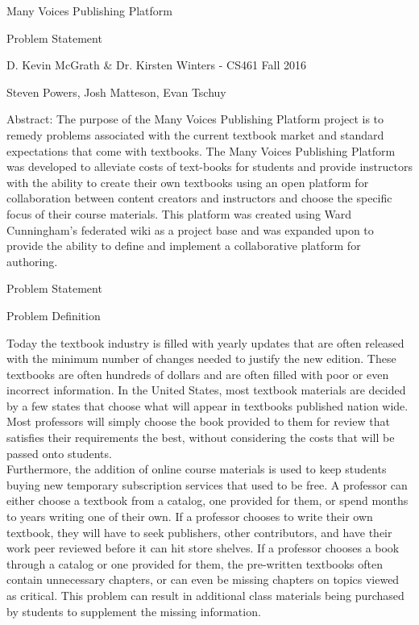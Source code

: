 \documentclass[letterpaper, 10pt, draftclsnofoot, onecolumn]{IEEEtran}
\begin{document}
\begin{titlepage}
\centering
{\huge Many Voices Publishing Platform\par}
{\LARGE Problem Statement\par}
{\vspace{2mm}}
{\large D. Kevin McGrath \& Dr. Kirsten Winters -  CS461 Fall 2016\par}
{\large Steven Powers, Josh Matteson, Evan Tschuy\par}
{\vspace{10mm}}
{\large Abstract:  The purpose of the Many Voices Publishing Platform project is to remedy problems 
associated with the current textbook market and standard expectations that come 
with textbooks. The Many Voices Publishing Platform was developed to alleviate 
costs of text-books for students and provide instructors with the ability 
to create their own textbooks using an open platform for collaboration between 
content creators and instructors and choose the specific focus of their course materials. 
This platform was created using Ward Cunningham’s federated wiki as a project 
base and was expanded upon to provide the ability to define and implement a 
collaborative platform for authoring.\par}
\end{titlepage}

\vspace{1pc}
\centerline{\sc \large Problem Statement}
\vspace{2pc}

\vspace{1pc}
\normalsize Problem Definition
\vspace{1pc}

 Today the textbook industry is filled with yearly updates that are often released with the
minimum number of changes needed to justify the new edition. These textbooks are often hundreds of dollars 
and are often filled with poor or even incorrect information. In the United States, most textbook materials are 
decided by a few states that choose what will appear in textbooks published nation wide. Most professors will
simply choose the book provided to them for review that satisfies their requirements the best, without 
considering the costs that will be passed onto students. \\
 
Furthermore, the addition of online course materials is used to keep students buying new 
temporary subscription services that used to be free. A professor can either choose a textbook 
from a catalog, one provided for them, or spend months to years writing one of their own. 
If a professor chooses to write their own textbook, they will have to seek publishers,
other contributors, and have their work peer reviewed before it can hit store shelves. 
If a professor chooses a book through a catalog or one provided for them, the pre-written textbooks 
often contain unnecessary chapters, or can even be missing chapters on topics viewed as critical. This problem can result in 
additional class materials being purchased by students to supplement the missing information. \\
\end{document}
